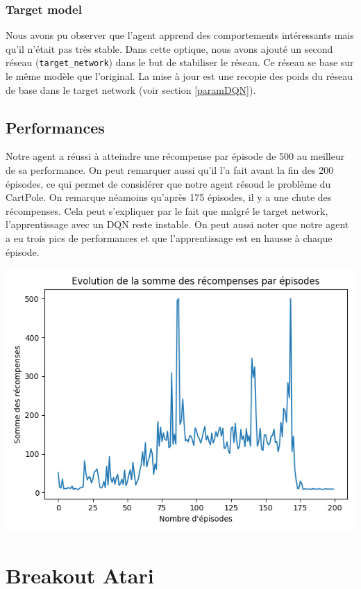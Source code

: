 \documentclass[10pt,a4paper]{article}
\begin{document}
\subsubsection{Target model} \label{targetmodelDQN}

Nous avons pu observer que l'agent apprend des comportements intéressants mais qu'il n'était pas très stable. Dans cette optique, nous avons ajouté un second réseau (\lstinline{target_network}) dans le but de stabiliser le réseau. Ce réseau se base sur le même modèle que l'original. La mise à jour est une recopie des poids du réseau de base dans le target network (voir section \ref{paramDQN}).

\subsection{Performances}

Notre agent a réussi à atteindre une récompense par épisode de 500 au meilleur de sa performance. On peut remarquer aussi qu'il l'a fait avant la fin des 200 épisodes, ce qui permet de considérer que notre agent résoud le problème du CartPole. On remarque néamoins qu'après 175 épisodes, il y a une chute des récompenses. Cela peut s'expliquer par le fait que malgré le target network, l'apprentissage avec un DQN reste instable. On peut aussi noter que notre agent a eu trois pics de performances et que l'apprentissage est en hausse à chaque épisode.

\includegraphics[scale=0.5]{../performances/evolution_recompenses_dqn_cartpole.png}

\section{Breakout Atari}
\end{document}
